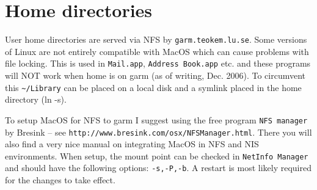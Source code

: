 \documentclass[a4paper,10pt]{article}
\begin{document}
\section{Home directories}
User home directories are served via NFS by \verb'garm.teokem.lu.se'. Some
versions of Linux are not entirely compatible with MacOS which can cause
problems with file locking. This is used in \verb+Mail.app+, \verb+Address Book.app+
etc. and these programs will NOT work when home is on garm (as of
writing, Dec. 2006). To circumvent this \verb+~/Library+ can be placed on a
local disk and a symlink placed in the home directory (ln -s).

To setup MacOS for NFS to garm I suggest using the free program
\verb+NFS manager+ by Bresink -- see
\verb+http://www.bresink.com/osx/NFSManager.html+.
There you will also find a very nice manual on integrating MacOS in NFS
and NIS environments. When setup, the mount point can be checked in
\verb+NetInfo Manager+ and should have the following options: \verb+-s,-P,-b+.
A restart is most likely required for the changes to take effect.
\end{document}

